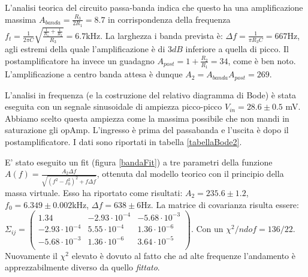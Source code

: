 \documentclass[10pt,a4paper]{article}
\begin{document}
L'analisi teorica del circuito passa-banda indica che questo ha una amplificazione massima $A_{banda} = \frac{R_3}{2 R_1} = 8.7$ in corrispondenza della frequenza $f_t = \frac{1}{2 \pi C} \sqrt{\frac{\frac{1}{R_1} + \frac{1}{R_2}}{R_3}} = 6.7 \mbox{kHz}$. %
La larghezza i banda prevista è: $\Delta f = \frac{1}{\pi R_3 C} = 667$Hz, agli estremi della quale l'amplificazione è di $3 dB$ inferiore a quella di picco. Il postamplificatore ha invece un guadagno $A_{post} = 1 + \frac{R_2}{R_1} = 34$, come è ben noto. L'amplificazione a centro banda attesa è dunque $A_{2} = A_{banda} A_{post} = 269$.

L'analisi in frequenza (e la costruzione del relativo diagramma di Bode) è stata eseguita con un segnale sinusoidale di ampiezza picco-picco $V_{in} = 28.6 \pm 0.5$ mV. Abbiamo scelto questa ampiezza come la massima possibile che non mandi in saturazione gli opAmp. L'ingresso è prima del passabanda e l'uscita è dopo il postamplificatore. I dati sono riportati in tabella \ref{tabellaBode2}.

E' stato eseguito un fit (figura \ref{bandaFit}) a tre parametri della funzione $A(f) = \frac{A_2 \Delta f}{\sqrt{(f^2-f_0^2)^2+f \Delta f}}$, ottenuta dal modello teorico con il principio della massa virtuale. Esso ha riportato come risultati: $A_2 = 235.6 \pm 1.2$, $f_0 = 6.349 \pm 0.002$kHz, $\Delta f = 638 \pm 6$Hz. La matrice di covarianza risulta essere: $ \Sigma_{ij} = \left( \begin{array}{ccc}
1.34 & -2.93 \cdot 10^{-4} & -5.68 \cdot 10^{-3}\\ 
-2.93 \cdot 10^{-4} & 5.55 \cdot 10^{-4} & 1.36 \cdot 10^{-6}\\
-5.68 \cdot 10^{-3} & 1.36 \cdot 10^{-6} & 3.64 \cdot 10^{-5}\\
\end{array} \right)$. Con un $\chi^2/ndof = 136/22$.\\
Nuovamente il $\chi^2$ elevato è dovuto al fatto che ad alte frequenze l'andamento è apprezzabilmente diverso da quello \emph{fittato}.

\end{document}

